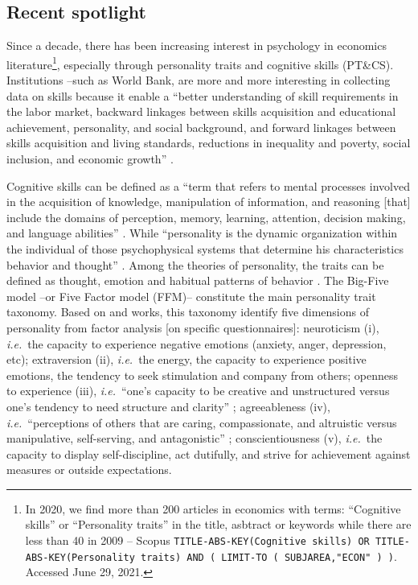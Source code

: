 \documentclass[a4paper, 11pt, onecolumn]{article}
\newcommand{\ie}{\textit{i.e.}}
\begin{document}
\subsection{Recent spotlight}
	


Since a decade, there has been increasing interest in psychology in economics literature\footnote{In 2020, we find more than 200 articles in economics with terms: ``Cognitive skills'' or ``Personality traits'' in the title, asbtract or keywords while there are less than 40 in 2009 -- Scopus \texttt{TITLE-ABS-KEY(Cognitive skills) OR TITLE-ABS-KEY(Personality traits) AND ( LIMIT-TO ( SUBJAREA,"ECON" ) )}. Accessed June 29, 2021.}, especially through personality traits and cognitive skills (PT\&CS).
Institutions --such as World Bank, are more and more interesting in collecting data on skills because it enable a ``better understanding of skill requirements in the labor market, backward linkages between skills acquisition and educational achievement, personality, and social background, and forward linkages between skills acquisition and living standards, reductions in inequality and poverty, social inclusion, and economic growth'' \citep{STEP2014}.

Cognitive skills can be defined as a ``term that refers to mental processes involved in the acquisition of knowledge, manipulation of information, and reasoning [that] include the domains of perception, memory, learning, attention, decision making, and language abilities'' \citep{Kiely2014}.
While ``personality is the dynamic organization within the individual of those psychophysical systems that determine his characteristics behavior and thought'' \citep{Allport1961}.
Among the theories of personality, the traits can be defined as thought, emotion and habitual patterns of behavior \citep{Kassin2003}.
The Big-Five model --or Five Factor model (FFM)-- constitute the main personality trait taxonomy.
Based on \cite{Goldberg1981} and \cite{McCrae1987} works, this taxonomy identify five dimensions of personality from factor analysis [on specific questionnaires]: neuroticism (i), \ie~the capacity to experience negative emotions (anxiety, anger, depression, etc); extraversion (ii), \ie~the energy, the capacity to experience positive emotions, the tendency to seek stimulation and company from others; openness to experience (iii), \ie~``one’s capacity to be creative and unstructured versus one’s tendency to need structure and clarity'' \citep{Piedmont2014}; agreeableness (iv), \ie~``perceptions of others that are caring, compassionate, and altruistic versus manipulative, self-serving, and antagonistic'' \citep{Piedmont2014}; conscientiousness (v), \ie~the capacity to display self-discipline, act dutifully, and strive for achievement against measures or outside expectations.	
	
\end{document}
